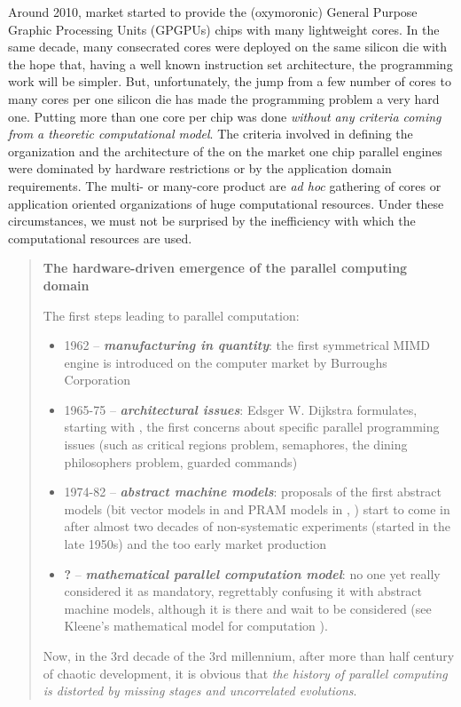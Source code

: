  Around 2010,  market started to provide the (oxymoronic) General Purpose Graphic Processing Units (GPGPUs) chips with many lightweight cores. In the same decade, many consecrated cores were deployed on the same silicon die with the hope that, having a well known instruction set architecture, the programming work will be simpler. But, unfortunately, the jump from a few number of cores to many cores per one silicon die has made the programming problem a very hard one. Putting more than one core per chip was done {\em without any criteria coming from a theoretic computational model}. The criteria involved in defining the organization and the architecture of the on the market one chip parallel engines were dominated by hardware restrictions or by the application domain requirements. The multi- or many-core product are {\em ad hoc} gathering of cores or application oriented organizations of huge computational resources. Under these circumstances, we must not be surprised by the inefficiency with which the computational resources are used.


{\small
\begin{shaded*}
\begin{quote}
{\bf The hardware-driven emergence of the parallel computing domain}

\smallskip

The first steps  leading to parallel computation:
\begin{itemize}
    \item 1962 -- {\bf {\em manufacturing in quantity}}: the first symmetrical MIMD engine is introduced on the computer market by Burroughs Corporation
    \item 1965-75 -- {\bf {\em architectural issues}}: Edsger W. Dijkstra formulates, starting with  \citep{Dijkstra65}, the first concerns about specific parallel programming issues (such as critical regions problem, semaphores, the dining philosophers problem, guarded commands)
    \item 1974-82 -- {\bf {\em abstract machine models}}: proposals of the first abstract models (bit vector  models in \citep{Pratt74} and PRAM models in \citep{Fortune78}, \citep{Goldschlage82}) start to come in after almost two decades of non-systematic experiments (started in the late 1950s) and the too early market production
    \item {\bf ?} -- {\bf {\em mathematical parallel computation model}}: no one yet really considered it as mandatory, regrettably confusing it with abstract machine models, although it is there and wait to be considered (see Kleene's mathematical model for computation  \citep{Kleene36}).
\end{itemize}
Now, in the 3rd decade of the 3rd millennium, after more than half century of chaotic development, it is obvious that {\em the history of parallel computing is distorted by missing stages and uncorrelated evolutions}.
\end{quote}
\end{shaded*}
}

